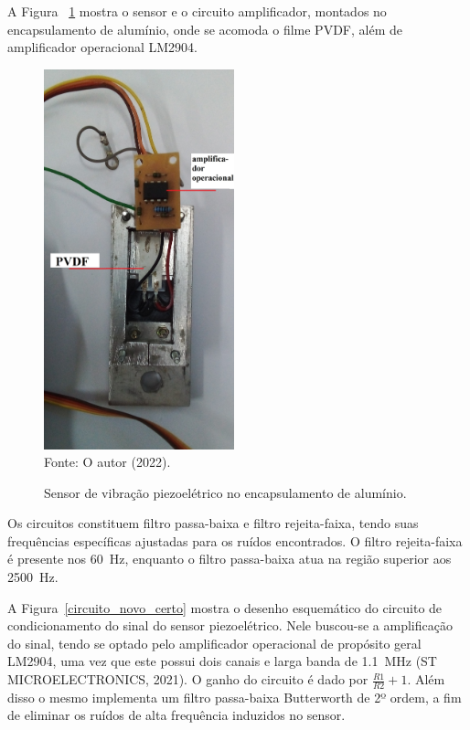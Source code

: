 \documentclass[
	12pt,				
	oneside,			
	a4paper,			
	english,			
	brazil,	
	sumario=abnt-6027-2012		
	]{abntex2ppgsi}
\begin{document}
A Figura ~\ref{sensor_e_operacional} mostra o sensor e o circuito amplificador, montados no encapsulamento de alumínio, onde se acomoda o filme PVDF, além de amplificador operacional LM2904.
 
\begin{figure}[H]
\centering
\caption {Sensor de vibração piezoelétrico no encapsulamento de alumínio.}
\includegraphics[width=\textwidth,height=110mm,keepaspectratio]{sensor_e_operacional} \\
Fonte: O autor (2022).
\label{sensor_e_operacional}
\end{figure} 

Os circuitos constituem filtro passa-baixa e filtro rejeita-faixa, tendo suas frequências específicas ajustadas para os ruídos encontrados. O filtro rejeita-faixa é presente nos \SI{60}{\hertz}, enquanto o filtro passa-baixa atua na região superior aos \SI{2500}{\hertz}.

A Figura~\ref{circuito_novo_certo} mostra o desenho esquemático do circuito de condicionamento do sinal do sensor piezoelétrico. Nele buscou-se a amplificação do sinal, tendo se optado pelo amplificador operacional de propósito geral LM2904, uma vez que este possui dois canais e larga banda de \SI{1.1}{\mega\hertz} (ST MICROELECTRONICS, 2021). O ganho do circuito é dado por $ \frac{R1}{R2} + 1$. Além disso o mesmo implementa um filtro passa-baixa Butterworth de 2º ordem, a fim de eliminar os ruídos de alta frequência induzidos no sensor.  
\end{document}
